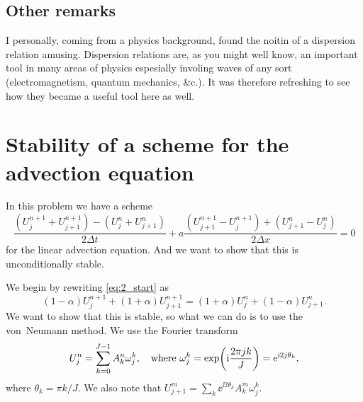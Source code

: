 \documentclass[11pt,letter, swedish, english
]{article}
\newcommand{\Dx}{\ensuremath{\Delta{x}}}
\newcommand{\Dt}{\ensuremath{\Delta{t}}}
\begin{document}
\clearpage
\restoregeometry
\addtocounter{subsection}{4}
\subsection{Other remarks}
I personally, coming from a physics background, found the noitin of a
dispersion relation amusing. Dispersion relations are, as you might
well know, an important tool in many areas of physics espesially
involing waves of any sort (electromagnetism, quantum
mechanics, \&c.). It was therefore refreshing to see how they became a
useful tool here as well. 


\section{Stability of a scheme for the advection equation}
In this problem we have a scheme
\begin{equation}\label{eq:2_start}
\frac{(U_j^{n+1}+U_{j+1}^{n+1})-(U_j^n+U_{j+1}^n)}{2\Dt}
+a\frac{(U_{j+1}^{n+1}-U_{j}^{n+1})+(U_{j+1}^n-U_j^n)}{2\Dx}=0
\end{equation}
for the linear advection equation. And we want to show that this is
unconditionally stable.

We begin by rewriting \eqref{eq:2_start} as
\begin{equation}\label{eq:2_real_space}
(1-\alpha)U_{j}^{n+1}+(1+\alpha)U_{j+1}^{n+1}
=(1+\alpha)U_{j}^{n}+(1-\alpha)U_{j+1}^{n}.
\end{equation}
We want to show that this is stable, so what we can do is to use the
von~Neumann method. We use the Fourier transform
\begin{equation}
U_j^n=\sum_{k=0}^{J-1} A_k^n\omega_j^k
\qcomma\text{where } \omega_j^k=\exp(\ii\frac{2\pi jk}{J})=\ee^{\ii2j\theta_k},
\end{equation}
where $\theta_k=\pi k/J$. We also note that 
$U_{j+1}^m=\sum_k \ee^{\ii2\theta_k}A_k^m\omega_j^k$.
\end{document}
